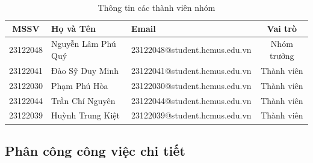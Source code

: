 \documentclass[12pt,a4paper]{article}
\let\oldtextbf\textbf
\renewcommand{\textbf}[1]{\oldtextbf{\textcolor{hcmublue}{#1}}}
\begin{document}
\begin{table}[H]
\centering
\begin{tabular}{|c|l|l|c|}
\hline
\textbf{MSSV} & \textbf{Họ và Tên} & \textbf{Email} & \textbf{Vai trò} \\ \hline
23122048 & Nguyễn Lâm Phú Quý  & 23122048@student.hcmus.edu.vn & Nhóm trưởng \\ \hline
23122041 & Đào Sỹ Duy Minh     & 23122041@student.hcmus.edu.vn & Thành viên  \\ \hline
23122030 & Phạm Phú Hòa        & 23122030@student.hcmus.edu.vn & Thành viên  \\ \hline
23122044 & Trần Chí Nguyên     & 23122044@student.hcmus.edu.vn & Thành viên  \\ \hline
23122039 & Huỳnh Trung Kiệt    & 23122039@student.hcmus.edu.vn & Thành viên  \\ \hline
\end{tabular}
\caption{Thông tin các thành viên nhóm}
\label{tab:team_info}
\end{table}

\subsection{Phân công công việc chi tiết}
\end{document}

